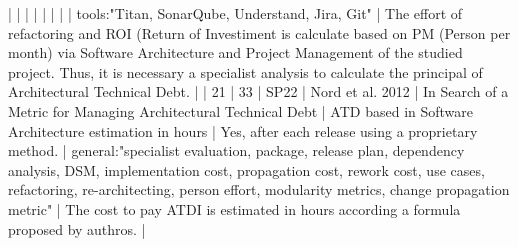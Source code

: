 |    |            |      |                                                                      |                                                                                                                                                                          |                                                                                                                                                                                                                                                            |                                                                                                                                                                                                                                                                      |  tools:"Titan, SonarQube, Understand, Jira, Git"                                                                                                                                                                                                                                                         |  The effort of refactoring and ROI (Return of Investiment is calculate based on PM (Person per month) via Software Architecture and Project Management of the studied project. Thus, it is necessary a specialist analysis to calculate the principal of Architectural Technical Debt.                                                                                                                                                                                                       |
| 21 |         33 | SP22 | Nord et al. 2012                                                     | In Search of a Metric for Managing Architectural Technical Debt                                                                                                          | ATD based in Software Architecture estimation in hours                                                                                                                                                                                                   | Yes, after each release using a proprietary method.                                                                                                                                                                                                                | general:"specialist evaluation, package, release plan, dependency analysis, DSM, implementation cost, propagation cost, rework cost, use cases, refactoring, re-architecting, person effort, modularity metrics, change propagation metric"                                                              | The cost to pay ATDI is estimated in hours according a formula proposed by authros.                                                                                                                                                                                                                                                                                                                                                                                                      |
